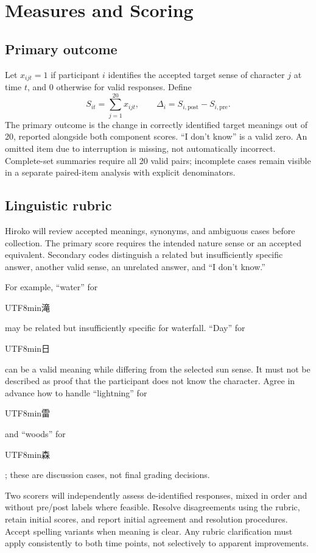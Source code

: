 \documentclass[11pt,letterpaper]{article}
\newcommand{\kanji}[1]{\begin{CJK}{UTF8}{min}#1\end{CJK}}
\begin{document}
\section{Measures and Scoring}
\subsection{Primary outcome}
Let $x_{ijt}=1$ if participant $i$ identifies the accepted target sense of character $j$ at time $t$, and 0 otherwise for valid responses. Define
\[
S_{it}=\sum_{j=1}^{20}x_{ijt},\qquad
\Delta_i=S_{i,\mathrm{post}}-S_{i,\mathrm{pre}}.
\]
The primary outcome is the change in correctly identified target meanings out of 20, reported alongside both component scores. ``I don't know'' is a valid zero. An omitted item due to interruption is missing, not automatically incorrect. Complete-set summaries require all 20 valid pairs; incomplete cases remain visible in a separate paired-item analysis with explicit denominators.

\subsection{Linguistic rubric}
Hiroko will review accepted meanings, synonyms, and ambiguous cases before collection. The primary score requires the intended nature sense or an accepted equivalent. Secondary codes distinguish a related but insufficiently specific answer, another valid sense, an unrelated answer, and ``I don't know.''

For example, ``water'' for \kanji{滝} may be related but insufficiently specific for waterfall. ``Day'' for \kanji{日} can be a valid meaning while differing from the selected sun sense. It must not be described as proof that the participant does not know the character. Agree in advance how to handle ``lightning'' for \kanji{雷} and ``woods'' for \kanji{森}; these are discussion cases, not final grading decisions.

Two scorers will independently assess de-identified responses, mixed in order and without pre/post labels where feasible. Resolve disagreements using the rubric, retain initial scores, and report initial agreement and resolution procedures. Accept spelling variants when meaning is clear. Any rubric clarification must apply consistently to both time points, not selectively to apparent improvements.
\end{document}
